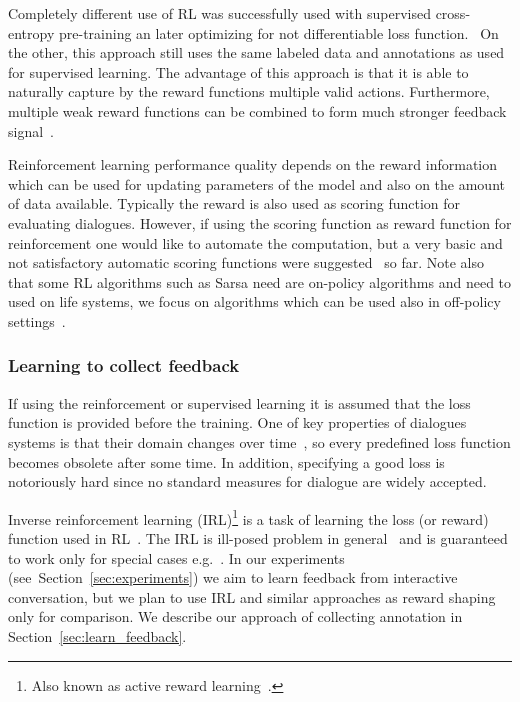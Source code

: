 \documentclass[11pt]{article}
\begin{document}
Completely different use of RL was successfully used with supervised cross-entropy pre-training an later optimizing for not differentiable loss function.~\cite{williams2016end}
On the other, this approach still uses the same labeled data and annotations as used for supervised learning.
The advantage of this approach is that it is able to naturally capture by the reward functions multiple valid actions.
Furthermore, multiple weak reward functions can be combined to form much stronger feedback signal~\cite{abbeel_apprenticeship_2004}.

Reinforcement learning performance quality depends on the reward information which can be used for updating parameters of the model and also on the amount of data available.
Typically the reward is also used as scoring function for evaluating dialogues.
However, if using the scoring function as reward function for reinforcement one would like to automate the computation, but a very basic and not satisfactory automatic scoring functions were suggested~\cite{liu_how_2016,lowe_evaluation_2016} so far. 
Note also that some RL algorithms such as Sarsa need are on-policy algorithms and need to used on life systems, we focus on algorithms which can be used also in off-policy settings~\cite{sutton_reinforcement_1998}.

\subsubsection*{Learning to collect feedback}\label{sub:irl}
If using the reinforcement or supervised learning it is assumed that the loss function is provided before the training.
One of key properties of dialogues systems is that their domain changes over time~\cite{yu_evolvable_2016}, so every predefined loss function becomes obsolete after some time.
In addition, specifying a good loss is notoriously hard since no standard measures for dialogue are widely accepted.

Inverse reinforcement learning (IRL)\footnote{Also known as active reward learning~\cite{su2016active}.} is a task of learning the loss (or reward) function used in RL~\cite{abbeel_apprenticeship_2004}.
The IRL is ill-posed problem in general~\cite{choi_inverse_2011} and is guaranteed to work only for special cases e.g.~\cite{abbeel_apprenticeship_2004,choi_inverse_2011}.  
In our experiments (see~Section~\ref{sec:experiments}) we aim to learn feedback from interactive conversation, but we plan to use IRL and similar approaches as reward shaping~\cite{su2016active} only for comparison.
We describe our approach of collecting annotation in Section~\ref{sec:learn_feedback}.
\end{document}
